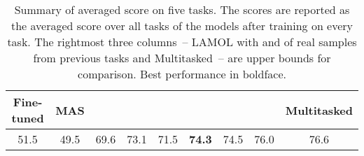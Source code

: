 \documentclass{article} \usepackage{iclr2020_conference,times}
\begin{document}
 \begin{table*}[!tp]
\centering
    \begin{adjustbox}{max width=\textwidth}
    \begin{tabular}{*{6}{c}||ccc}
    \toprule
    \small Fine-tuned & \small MAS & \small  & \small  & \small  & \small  & \small  & \small  & \small Multitasked \\
    \midrule
    51.5 & 49.5 & 69.6 & 73.1 & 71.5 & \textbf{74.3} & 74.5 & 76.0 & 76.6 \\
    \bottomrule
    \end{tabular}
    \end{adjustbox}
    \caption{Summary of averaged score on five tasks. The scores are reported as the averaged score over all tasks of the models after training on every task. The rightmost three columns~-- LAMOL with  and  of real samples from previous tasks and Multitasked~-- are upper bounds for comparison. Best performance in boldface.}
\label{tab:five_tasks}
\end{table*}
 
\end{document}
